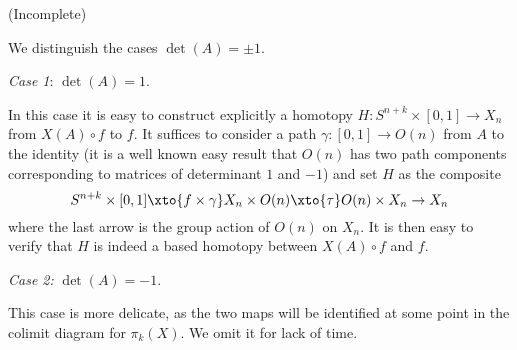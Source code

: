 
\def \simto{\xrightarrow{\sim}}


\mmaketitle

\begin{exercise}[1](Incomplete)\ 

We distinguish the cases $\det(A)=\pm1$.

\textit{Case 1}: $\det(A)=1$.

In this case it is easy to construct explicitly a homotopy $H:S^{n+k}\times[0,1]\to X_n$ from $X(A)\circ f$ to $f$. It suffices to consider a path $\gamma:[0,1]\to O(n)$ from $A$ to the identity (it is a well known easy result that $O(n)$ has two path components corresponding to matrices of determinant $1$ and $-1$) and set $H$ as the composite
\[S^{n+k}\times[0,1]\xto{f\times\gamma}X_n\times O(n)\xto{\tau}O(n)\times X_n\to X_n\]
where the last arrow is the group action of $O(n)$ on $X_n$. It is then easy to verify that $H$ is indeed a based homotopy between $X(A)\circ f$ and $f$.

\textit{Case 2:} $\det(A)=-1$.

This case is more delicate, as the two maps will be identified at some point in the colimit diagram for $\pi_k(X)$. We omit it for lack of time.
\end{exercise}

